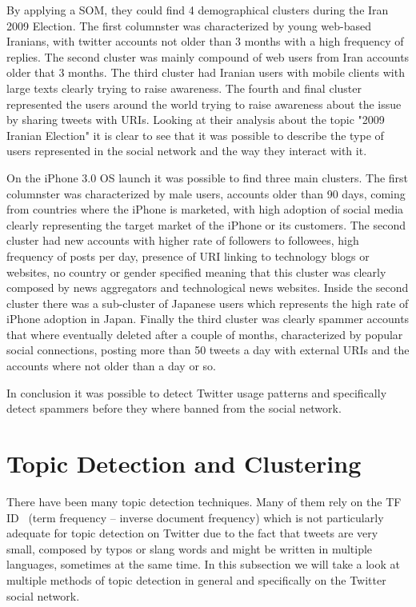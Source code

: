 By applying a SOM, they could find 4 demographical clusters during the Iran 2009 Election. The first columnster was characterized by young web-based Iranians, with twitter accounts not older than 3 months with a high frequency of replies. The second cluster was mainly compound of web users from Iran accounts older that 3 months. The third cluster had Iranian users with mobile clients with large texts clearly trying to raise awareness. The fourth and final cluster represented the users around the world trying to raise awareness about the issue by sharing tweets with URIs.
Looking at their analysis about the topic "2009 Iranian Election" it is clear to see that it was possible to describe the type of users represented in the social network and the way they interact with it.

On the iPhone 3.0 OS launch it was possible to find three main clusters. The first columnster was characterized by male users, accounts older than 90 days, coming from countries where the iPhone is marketed, with high adoption of social media clearly representing the target market of the iPhone or its customers. The second cluster had new accounts with higher rate of followers to followees, high frequency of posts per day, presence of URI linking to technology blogs or websites, no country or gender specified meaning that this cluster was clearly composed by news aggregators and technological news websites. Inside the second cluster there was a sub-cluster of Japanese users which represents the high rate of iPhone adoption in Japan. Finally the third cluster was clearly spammer accounts that where eventually deleted after a couple of months, characterized by popular social connections, posting more than 50 tweets a day with external URIs and the accounts where not older than a day or so.

In conclusion it was possible to detect Twitter usage patterns and specifically detect spammers before they where banned from the social network. 

\section{Topic Detection and Clustering} 
\label{sec:topic_detection_on_twitter}
There have been many topic detection techniques. Many of them rely on the TF ID~\cite{Baeza-Yates:1999:MIR:553876} (term frequency – inverse document frequency) which is not particularly adequate for topic detection on Twitter due to the fact that tweets are very small, composed by typos or slang words and might be written in multiple languages, sometimes at the same time. In this subsection we will take a look at multiple methods of topic detection in general and specifically on the Twitter social network.

